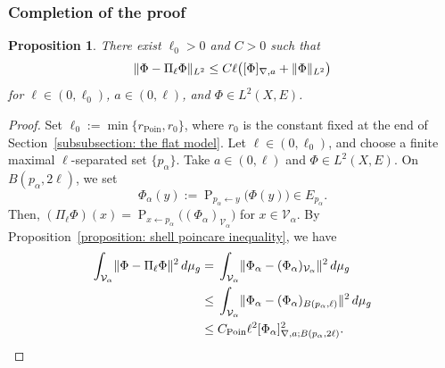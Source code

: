 \documentclass[a4paper,oneside,12pt]{amsart}
\theoremstyle{plain}
\newtheorem{proposition}[theorem]{Proposition}
\theoremstyle{definition}
\theoremstyle{remark}
\DeclarePairedDelimiter{\norm}{\lVert}{\rVert}
\DeclarePairedDelimiter{\seminorm}{\lbrack}{\rbrack}
\newcommand{\dvol}{d\mu}
\newcommand{\paralleltransport}[2]{\operatorname{P}_{#2 \gets #1}}
\newcommand{\Ltwonorm}[2][L^2]{\norm{#2}_{#1}}
\newcommand{\mesoscopicdifferenceseminorm}[2][a]{\seminorm{#2}_{\nabla,#1}}
\newcommand{\mesoscopicdifferenceseminormLocal}[3][a]{\seminorm{#3}_{\nabla,#1;#2}}
\newcommand{\voronoicell}{\mathcal{V}}
\newcommand{\radiusPoincare}{r_{\mathrm{Poin}}}
\newcommand{\constantPoincare}{C_{\mathrm{Poin}}}
\begin{document}
\subsubsection{Completion of the proof}

\begin{proposition}\label{proposition: voronoi approximation error estimate}
  There exist $\ell_0 > 0$ and $C > 0$ such that
  \begin{equation}
    \Ltwonorm{\Phi - \Pi_{\ell}\Phi} \le C \ell \bigl( \mesoscopicdifferenceseminorm{\Phi} + \Ltwonorm{\Phi} \bigr)
  \end{equation}
  for $\ell \in (0,\ell_0)$, $a \in (0,\ell)$, and $\Phi \in L^2(X,E)$.
\end{proposition}
\begin{proof}
  Set $\ell_0 := \min \{\radiusPoincare, r_0\}$, where $r_0$ is the constant fixed at the end of Section~\ref{subsubsection: the flat model}.
  Let $\ell \in (0,\ell_0)$, and choose a finite maximal $\ell$-separated set $\{p_{\alpha}\}$.
  Take $a \in (0,\ell)$ and $\Phi \in L^2(X,E)$.
  On $B(p_{\alpha},2\ell)$, we set
  \begin{equation}
    \Phi_{\alpha}(y) := \paralleltransport{y}{p_{\alpha}} \bigl(\Phi(y)\bigr) \in E_{p_{\alpha}}.
  \end{equation}
  Then, $(\Pi_{\ell} \Phi)(x) = \paralleltransport{p_{\alpha}}{x} \bigl((\Phi_{\alpha})_{\voronoicell_{\alpha}}\bigr)$ for $x \in \voronoicell_{\alpha}$.
  By Proposition~\ref{proposition: shell poincare inequality}, we have
  \begin{equation}
    \begin{aligned}
    \int_{\voronoicell_{\alpha}} \norm{\Phi - \Pi_{\ell}\Phi}^2 \,\dvol_g ={}& \int_{\voronoicell_{\alpha}} \norm{\Phi_{\alpha} - (\Phi_{\alpha})_{\voronoicell_{\alpha}}}^2 \,\dvol_g \\
    \le{}& \int_{\voronoicell_{\alpha}} \norm{\Phi_{\alpha} - (\Phi_{\alpha})_{B(p_{\alpha},\ell)}}^2 \,\dvol_g \\
    \le{}& \constantPoincare \ell^2 \mesoscopicdifferenceseminormLocal{B(p_{\alpha},2\ell)}{\Phi_{\alpha}}^2.
    \end{aligned}
  \end{equation}


\end{proof}
\end{document}
